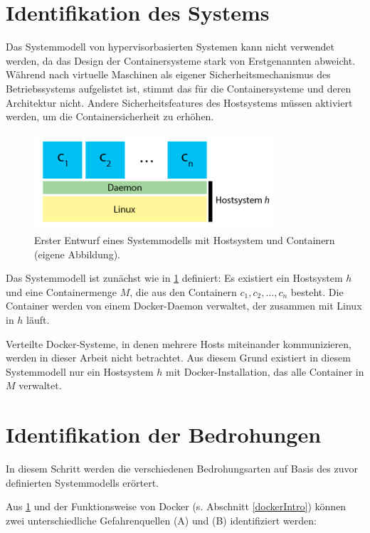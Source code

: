 \documentclass[../main.tex]{subfiles}
\begin{document}
  \section{Identifikation des Systems}
    Das Systemmodell von hypervisorbasierten Systemen kann nicht verwendet werden, da das Design der Containersysteme stark von Erstgenannten abweicht. Während nach \cite[S.125]{CISSP} virtuelle Maschinen als eigener Sicherheitsmechanismus des Betriebssystems aufgelistet ist, stimmt das für die Containersysteme und deren Architektur nicht. Andere Sicherheitsfeatures des Hostsystems müssen aktiviert werden, um die Containersicherheit zu erhöhen.

    \begin{figure}[h]
        \centering
        \includegraphics[width=0.8\textwidth]{./images/question_model1.png}
        \caption{Erster Entwurf eines Systemmodells mit Hostsystem und Containern (eigene Abbildung).}
        \label{fig:question_model1}
    \end{figure}

    Das Systemmodell ist zunächst wie in \fig \ref{fig:question_model1} definiert: Es existiert ein Hostsystem \(h\) und eine Containermenge \(M\), die aus den Containern \(c_1,c_2,\dotsc,c_n\) besteht. Die Container werden von einem Docker-Daemon verwaltet, der zusammen mit Linux in \(h\) läuft.

    Verteilte Docker-Systeme, in denen mehrere Hosts miteinander kommunizieren, werden in dieser Arbeit nicht betrachtet. Aus diesem Grund existiert in diesem Systemmodell nur ein Hostsystem \(h\) mit Docker-Installation, das alle Container in \(M\) verwaltet.

  \section{Identifikation der Bedrohungen}
    In diesem Schritt werden die verschiedenen Bedrohungsarten auf Basis des zuvor definierten Systemmodells erörtert.

    Aus \fig \ref{fig:question_model1} und der Funktionsweise von Docker (s. Abschnitt \ref{dockerIntro}) können zwei unterschiedliche Gefahrenquellen (A) und (B) identifiziert werden:
\end{document}
